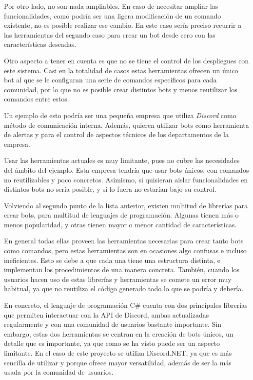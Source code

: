 Por otro lado, no son nada ampliables. En caso de necesitar ampliar las funcionalidades, como podría ser una ligera modificación de un comando existente, no es posible realizar ese cambio. En este caso sería preciso recurrir a las herramientas del segundo caso para crear un bot desde cero con las características deseadas.

Otro aspecto a tener en cuenta es que no se tiene el control de los despliegues con este sistema. Casi en la totalidad de casos estas herramientas ofrecen un único bot al que se le configuran una serie de comandos específicos para cada comunidad, por lo que no es posible crear distintos bots y menos reutilizar los comandos entre estos.

Un ejemplo de esto podría ser una pequeña empresa que utiliza \textit{Discord} como método de comunicación interna. Además, quieren utilizar bots como herramienta de alertas y para el control de aspectos técnicos de los departamentos de la empresa.

Usar las herramientas actuales es muy limitante, pues no cubre las necesidades del ámbito del ejemplo. Esta empresa tendría que usar bots únicos, con comandos no reutilizables y poco concretos. Asimismo, si quisieran aislar funcionalidades en distintos bots no sería posible, y si lo fuera no estarían bajo su control.

Volviendo al segundo punto de la lista anterior, existen multitud de librerías para crear bots, para multitud de lenguajes de programación. Algunas tienen más o menos popularidad, y otras tienen mayor o menor cantidad de características.

En general todas ellas proveen las herramientas necesarias para crear tanto bots como comandos, pero estas herramientas son en ocasiones algo confusas e incluso ineficientes. Esto se debe a que cada una tiene una estructura distinta, e implementan los procedimientos de una manera concreta. También, cuando los usuarios hacen uso de estas librerías y herramientas se comete un error muy habitual, ya que no reutiliza el código generado todo lo que se podría y debería.

En concreto, el lenguaje de programación C\# cuenta con dos principales librerías que permiten interactuar con la API de Discord, ambas actualizadas regularmente y con una comunidad de usuarios bastante importante. Sin embargo, estas dos herramientas se centran en la creación de bots únicos, un detalle que es importante, ya que como se ha visto puede ser un aspecto limitante. En el caso de este proyecto se utiliza Discord.NET, ya que es más sencilla de utilizar y porque ofrece mayor versatilidad, además de ser la más usada por la comunidad de usuarios.

